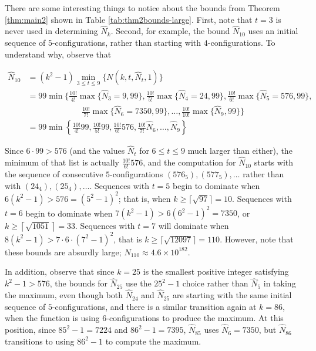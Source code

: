 \documentclass[reqno,12pt]{amsart}
\theoremstyle{plain}
\theoremstyle{definition}
\theoremstyle{remark}
\begin{document}
There are some interesting things to notice about the bounds from Theorem \ref{thm:main2} shown in Table \ref{tab:thm2bounds-large}. 
First, note that $t = 3$ is never used in determining $\hat{N}_{k}$. Second, for example,
 the bound $\hat{N}_{10}$ uses an initial sequence of $5$-configurations, rather than starting with $4$-configurations. 
To understand why, observe that

\begin{align*}\hat{N}_{10} &= (k^{2}-1) \min_{3 \leq t \leq 9} \{ N(k, t, \hat{N}_{t}, 1)\}\\
& = 99 \min\biggl\{\frac{10!}{4!} \max\{\hat{N}_{3} = 9, 99\}, \frac{10!}{5!} \max\{\hat{N}_{4} = 24, 99\}, \frac{10!}{6!} \max\{\hat{N}_{5} = 576, 99\}, \\
& \phantom{===}\;\,\, \qquad \frac{10!}{7!} \max\{\hat{N}_{6}=7350, 99\}, \ldots, 
\frac{10!}{10!} \max\{\hat{N}_{9}, 99\}\biggr\}\\
&= 99 \min\left\{\frac{10!}{4!} 99, \frac{10!}{5!} 99, \frac{10!}{6!} 576, \frac{10!}{7!} \hat{N}_{6}, \ldots,  \hat{N}_{9}\right\}
\end{align*}

Since $ 6 \cdot 99 > 576$ (and the values $\hat{N}_{t}$ for $ 6\leq t \leq 9$ much larger than either), the minimum of that list is 
actually $\frac{10!}{6!}576$, and the computation for $\hat{N}_{10}$ starts with the sequence of consecutive $5$-configurations 
$(576_{5}), (577_{5}), \ldots$ 
rather than with $(24_{4}), (25_{4}), \ldots$.
%
%
Sequences with $t = 5$ begin to dominate when $6(k^{2}-1) > 576 = (5^{2}-1)^{2}$; that is, when $k \geq \lceil\sqrt{97} \rceil = 10$. 
Sequences with $t = 6$ begin to dominate when $7(k^{2}-1) > 6(6^{2}-1)^{2} = 7350$, or $k \geq \left\lceil\sqrt{1051}\right\rceil = 33$.
Sequences with $t = 7$ will dominate when $8(k^{2}-1) >7\cdot6 \cdot (7^{2}-1)^{2}$, that is $k \geq \lceil\sqrt{12097}\rceil = 110$. 
However, note that these bounds are absurdly large;  $\hat{N}_{110} \approx 4.6 \times 10^{182}$.

In addition, observe that since $k = 25$ is the smallest positive integer satisfying $k^{2}-1>576$, the bounds for $\hat{N}_{25}$ 
use the $25^{2}-1$ choice rather than $\hat{N}_{5}$ in taking the maximum, even though both $\hat{N}_{24}$ and $\hat{N}_{25}$ 
are starting with the same initial sequence of $5$-configurations, and there is a similar transition again at $k = 86$, when the function is using $6$-configurations to produce the maximum. At this position, since $85^{2} - 1 = 7224$ and $86^{2}-1 = 7395$, $\hat{N}_{85}$ uses $\hat{N}_{6} = 7350$, but $\hat{N}_{86}$ transitions to using $86^{2} - 1$ to compute the maximum.  
\end{document}
